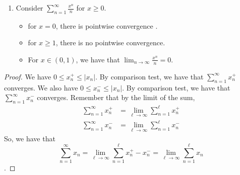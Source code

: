 \documentclass{report}
\begin{document}
{\begin{enumerate}
        \begin{itemize}
            \item for $x = 0$, it converges to 0.
            \item for $|x| > 1$, we have that \begin{align*}
                \lim_{n\to \infty} \frac{x^{2n}}{\sqrt[3]{n}} \log\left( 1 + \frac{x^2}{\sqrt[3]{n}}\right) = \lim_{n \to \infty} \frac{x^{2n+2}}{n^{2/3}} \frac{\log\left( 1 + \frac{x^2}{\sqrt[3]{n}}\right)}{x^2/\sqrt[3]{n}} = \infty
            \end{align*}
            \item for $|x| < 1$, $\lim_{n \to \infty} \frac{x^{2n}}{\sqrt[3]{n}} \log\left( 1 + \frac{x^2}{\sqrt[3]{n}}\right) = 0$
        \end{itemize}
        \item Consider $\sum_{n=1}^\infty \frac{x^n}{n}$ for $x \geq 0$.
        \begin{itemize}
            \item for $x = 0$, there is pointwise convergence .
            \item for $x \geq 1$, there is no pointwise convergence.
            \item For $x \in (0, 1)$, we have that $\lim_{n \to \infty} \frac{x^n}{n} = 0$.
        \end{itemize}
    \end{enumerate}
}
\newpage
{}
\begin{proof}
    We have $0 \leq x_n^+ \leq |x_n|$. By comparison test, we have that $\sum_{n=1}^\infty x_n^+$ converges. We also have $0 \leq x_n^- \leq |x_n|$. By comparison test, we have that $\sum_{n=1}^\infty x_n^-$ converges. Remember that by the limit of the sum,
    \begin{align*}
        \sum_{n=1}^\infty x_n^+ &= \lim_{\ell \to \infty}\sum_{n=1}^\ell x_n^+ \\
        \sum_{n=1}^\infty x_n^- &= \lim_{\ell \to \infty}\sum_{n=1}^\ell x_n^-
    \end{align*}
    So, we have that $$\sum_{n=1}^\infty x_n = 
    \lim_{\ell \to \infty}\sum_{n=1}^\ell x_n^+ -  x_n^- = \lim_{\ell \to \infty} \sum_{n=1}^\ell x_n$$. 
\end{proof}
\end{document}
